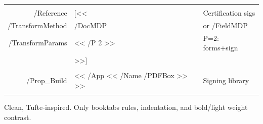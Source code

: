 \documentclass[11pt,a4paper]{article}
\newcommand{\ind}{\hspace{10pt}}
\begin{document}
{\begin{tabular}{@{}DEF@{}}
 \\
/Reference            & [<<               & Certification sigs \\
\ind /TransformMethod & /DocMDP           & or /FieldMDP \\
\ind /TransformParams & << /P 2 >>        & P=2: forms+sign \\
                      & >>]               & \\[3pt]

 \\
/Prop\_Build & << /App << /Name /PDFBox >> >> & Signing library \\

 \\[-6pt]
\bottomrule
\end{tabular}%
}%

\vfill\clearpage

{Clean, Tufte-inspired. Only booktabs rules, indentation, and bold/light weight contrast.}

\vspace{0.3em}
\end{document}
